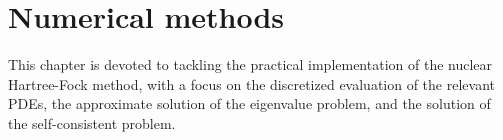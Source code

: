 \chapter{Numerical methods}
This chapter is devoted to tackling the practical implementation of the nuclear Hartree-Fock method, with a focus on the discretized evaluation of the relevant PDEs, the approximate solution of the eigenvalue problem, and the solution of the self-consistent problem.


